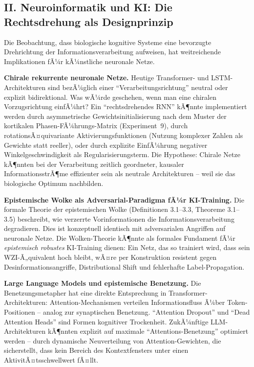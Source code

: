 ﻿\documentclass[12pt,a4paper]{report}
\theoremstyle{plain}
\theoremstyle{definition}
\theoremstyle{remark}
\begin{document}
	\subsection*{II. Neuroinformatik und KI: Die Rechtsdrehung als
		Designprinzip}

	Die Beobachtung, dass biologische kognitive Systeme eine
	bevorzugte Drehrichtung der Informationsverarbeitung aufweisen,
	hat weitreichende Implikationen fÃ¼r kÃ¼nstliche neuronale Netze.

	\textbf{Chirale rekurrente neuronale Netze.}
	Heutige Transformer- und LSTM-Architekturen sind bezÃ¼glich einer
	``Verarbeitungsrichtung'' neutral oder explizit bidirektional.
	Was wÃ¼rde geschehen, wenn man eine chiralen Vorzugsrichtung
	einfÃ¼hrt? Ein ``rechtsdrehendes RNN'' kÃ¶nnte implementiert werden
	durch asymmetrische Gewichtsinitialisierung nach dem Muster
	der kortikalen Phasen-FÃ¼hrungs-Matrix (Experiment~9),
	durch rotationsÃ¤quivariante Aktivierungsfunktionen
	(Nutzung komplexer Zahlen als Gewichte statt reeller),
	oder durch explizite EinfÃ¼hrung negativer Winkelgeschwindigkeit
	als Regularisierungsterm.
	Die Hypothese: Chirale Netze kÃ¶nnten bei der Verarbeitung
	zeitlich geordneter, kausaler InformationsstrÃ¶me effizienter
	sein als neutrale Architekturen -- weil sie das biologische
	Optimum nachbilden.

	\textbf{Epistemische Wolke als Adversarial-Paradigma fÃ¼r KI-Training.}
	Die formale Theorie der epistemischen Wolke (Definitionen 3.1--3.3,
	Theoreme 3.1--3.5) beschreibt, wie verzerrte Vorinformationen
	die Informationsverarbeitung degradieren.
	Dies ist konzeptuell identisch mit adversarialen Angriffen auf
	neuronale Netze. Die Wolken-Theorie kÃ¶nnte als formales Fundament
	fÃ¼r \emph{epistemisch robustes} KI-Training dienen:
	Ein Netz, das so trainiert wird, dass sein WZI-Ã„quivalent
	hoch bleibt, wÃ¤re per Konstruktion resistent gegen
	Desinformationsangriffe, Distributional Shift und
	fehlerhafte Label-Propagation.

	\textbf{Large Language Models und epistemische Benetzung.}
	Die Benetzungsmetapher hat eine direkte Entsprechung in
	Transformer-Architekturen: Attention-Mechanismen verteilen
	Informationsfluss Ã¼ber Token-Positionen -- analog zur
	synaptischen Benetzung. ``Attention Dropout'' und
	``Dead Attention Heads'' sind Formen kognitiver Trockenheit.
	ZukÃ¼nftige LLM-Architekturen kÃ¶nnten explizit auf
	maximale ``Attentions-Benetzung'' optimiert werden --
	durch dynamische Neuverteilung von Attention-Gewichten,
	die sicherstellt, dass kein Bereich des Kontextfensters
	unter einen AktivitÃ¤tsschwellwert fÃ¤llt.
\end{document}

